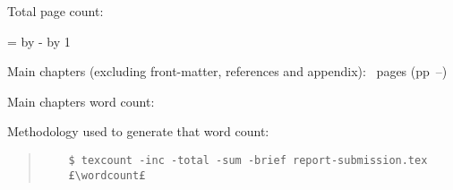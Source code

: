 \ifsubmission

\begin{defaultsffamily} %
Total page count: \pageref{LastPage}

\makeatletter
\@tempcnta=\relax%
\advance\@tempcnta by -%
\advance\@tempcnta by 1%
\xdef\contentpages{\the\@tempcnta}%
\makeatother

Main chapters (excluding front-matter, references and appendix):
\contentpages~pages
(pp~\pageref{firstcontentpage}--\pageref{lastcontentpage})

Main chapters word count: \wordcount

\vspace*{1em}
Methodology used to generate that word count:

\begin{quote}
\begin{verbatim}
    $ texcount -inc -total -sum -brief report-submission.tex
    £\wordcount£
\end{verbatim}
\end{quote}

\end{defaultsffamily}
\vspace{\fill}
\onehalfspacing






\else

